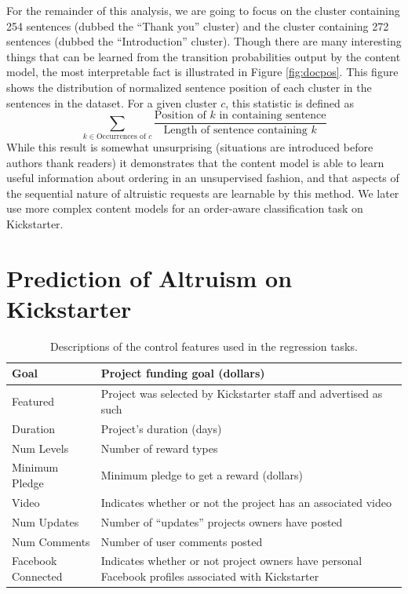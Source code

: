 \documentclass[letterpaper]{article}
\begin{document}
For the remainder of this analysis, we are going to focus on the cluster containing 254 sentences (dubbed the ``Thank you'' cluster) and the cluster containing 272 sentences (dubbed the ``Introduction'' cluster). Though there are many interesting things that can be learned from the transition probabilities output by the content model, the most interpretable fact is illustrated in Figure \ref{fig:docpos}. This figure shows the distribution of normalized sentence position of each cluster in the sentences in the dataset. For a given cluster $c$, this statistic is defined as
\begin{equation} \label{eq:sentpos}
\sum\limits_{k \in \text{Occurrences of $c$}} \frac{\text{Position of $k$ in containing sentence}}{\text{Length of sentence containing $k$}}
\end{equation}
While this result is somewhat unsurprising (situations are introduced before authors thank readers) it demonstrates that the content model is able to learn useful information about ordering in an unsupervised fashion, and that aspects of the sequential nature of altruistic requests are learnable by this method. We later use more complex content models for an order-aware classification task on Kickstarter.

\section{Prediction of Altruism on Kickstarter}
\begin{table}
\centering
\begin{tabular}{|l|L{5cm}|}
\hline
Goal & Project funding goal (dollars) \\\hline
Featured & Project was selected by Kickstarter staff and advertised as such\\\hline
Duration & Project's duration (days) \\\hline
Num Levels & Number of reward types \\\hline
Minimum Pledge & Minimum pledge to get a reward (dollars)\\\hline
Video & Indicates whether or not the project has an associated video \\\hline
Num Updates & Number of ``updates'' projects owners have posted \\\hline
Num Comments & Number of user comments posted \\\hline
Facebook Connected & Indicates whether or not project owners have personal Facebook profiles associated with Kickstarter\\
\hline
\end{tabular}
\caption{Descriptions of the control features used in the regression tasks.}
\label{tab:controls}
\end{table}
\end{document}
